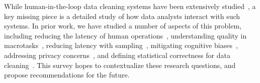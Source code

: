 While human-in-the-loop data cleaning systems have been extensively studied~\cite{gokhale2014corleone,DBLP:conf/cidr/StonebrakerBIBCZPX13, park2014crowdfill,chen2014integrating,YakoutENOI11,ChuKATARA, wisteria}, a key missing piece is a detailed study of how data analysts interact with such systems. 
In prior work, we have studied a number of aspects of this problem, including
reducing the latency of human operations~\cite{DBLP:journals/pvldb/HaasW0F15},
understanding quality in macrotasks~\cite{DBLP:journals/pvldb/HaasAGM15},
reducing latency with sampling~\cite{DBLP:journals/debu/KrishnanWFGKM015},
mitigating cognitive biases~\cite{DBLP:conf/recsys/KrishnanPFG14}, addressing privacy concerns~\cite{krishnan2016priv}, and  defining statistical correctness for data cleaning~\cite{krishnan2015svc, activecleanarxiv}.
This survey hopes to contextualize these research questions, and propose recommendations for the future.



